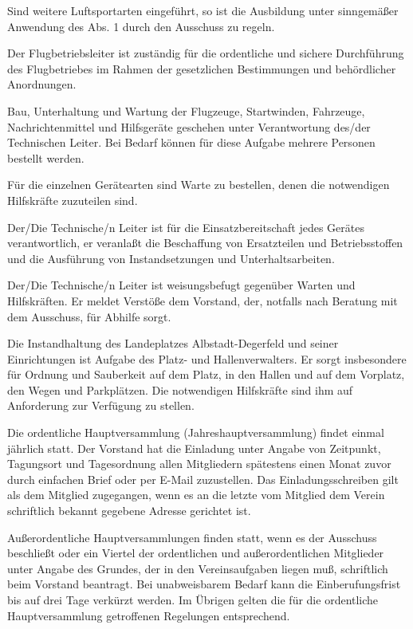 \documentclass[10pt,a4paper,parskip=half]{scrartcl}
\begin{document}
\begin{contract}
    Sind weitere Luftsportarten eingeführt,
    so ist die Ausbildung unter sinngemäßer Anwendung des Abs. 1 durch den Ausschuss zu regeln.
    
    Der Flugbetriebsleiter ist zuständig für die ordentliche und sichere Durchführung des Flugbetriebes im Rahmen der gesetzlichen Bestimmungen und behördlicher Anordnungen.
    
    Bau,
    Unterhaltung und Wartung der Flugzeuge,
    Startwinden,
    Fahrzeuge,
    Nachrichtenmittel und Hilfsgeräte geschehen unter Verantwortung des/der Technischen Leiter.
    Bei Bedarf können für diese Aufgabe mehrere Personen bestellt werden.
    
    Für die einzelnen Gerätearten sind Warte zu bestellen,
    denen die notwendigen Hilfskräfte zuzuteilen sind.
    
    Der/Die Technische/n Leiter ist für die Einsatzbereitschaft jedes Gerätes verantwortlich,
    er veranlaßt die Beschaffung von Ersatzteilen und Betriebsstoffen und die Ausführung von Instandsetzungen und Unterhaltsarbeiten.
    
    Der/Die Technische/n Leiter ist weisungsbefugt gegenüber Warten und Hilfskräften.
    Er meldet Verstöße dem Vorstand,
    der,
    notfalls nach Beratung mit dem Ausschuss,
    für Abhilfe sorgt.
    
    Die Instandhaltung des Landeplatzes Albstadt-Degerfeld und seiner Einrichtungen ist Aufgabe des Platz- und Hallenverwalters.
    Er sorgt insbesondere für Ordnung und Sauberkeit auf dem Platz,
    in den Hallen und auf dem Vorplatz,
    den Wegen und Parkplätzen.
    Die notwendigen Hilfskräfte sind ihm auf Anforderung zur Verfügung zu stellen.
    
    \label{C:Hauptversammlung}
    Die ordentliche Hauptversammlung (Jahreshauptversammlung) findet einmal jährlich statt.
    Der Vorstand hat die Einladung unter Angabe von Zeitpunkt,
    Tagungsort und Tagesordnung allen Mitgliedern spätestens einen Monat zuvor durch einfachen Brief oder per E-Mail zuzustellen.
    Das Einladungsschreiben gilt als dem Mitglied zugegangen,
    wenn es an die letzte vom Mitglied dem Verein schriftlich bekannt gegebene Adresse gerichtet ist.
    
    Außerordentliche Hauptversammlungen finden statt,
    wenn es der Ausschuss beschließt oder ein Viertel der ordentlichen und außerordentlichen Mitglieder unter Angabe des Grundes,
    der in den Vereinsaufgaben liegen muß,
    schriftlich beim Vorstand beantragt.
    Bei unabweisbarem Bedarf kann die Einberufungsfrist bis auf drei Tage verkürzt werden.
    Im Übrigen gelten die für die ordentliche Hauptversammlung getroffenen Regelungen entsprechend.
    

\end{contract}
\end{document}
